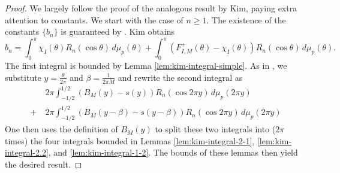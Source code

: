 \documentclass[11pt,letterpaper,reqno]{amsart}
\theoremstyle{definition}
\numberwithin{equation}{section}
\numberwithin{figure}{section}
\numberwithin{table}{section}
\begin{document}
\begin{proof}
  We largely follow the proof of the analogous result \cite[Theorem 2.6]{Kim24} by Kim, paying extra attention to constants. We start with the case of $n \geq 1$. The existence of the constants $\{b_n\}$ is guaranteed by \cite[Theorem 2.6]{Kim24}. Kim obtains
  \begin{equation}
      b_n = \int_0^\pi \chi_I(\theta) R_n(\cos \theta) \,d\mu_p(\theta) + \int_0^\pi \left( F_{I, M}^+(\theta) - \chi_I(\theta)  \right) R_n(\cos \theta) \,d\mu_p(\theta). \label{eqn:kim-decomp-of-bn}
  \end{equation}
The first integral is bounded by Lemma \ref{lem:kim-integral-simple}. As in \cite[Page 933]{DGMPT20}, we substitute $y = \frac{\theta}{2\pi} $ and $\beta = \frac{1}{2\pi M}$ and rewrite the second integral as
    \begin{align}
        &2\pi \int_{-1/2}^{1/2} \left( B_M(y) - s(y) \right) R_n(\cos 2\pi y ) \,d\mu_p(2\pi y)\\
        + ~ & 2\pi \int_{-1/2}^{1/2}
        \left( B_M(y - \beta ) - s(y - \beta) \right) R_n ( \cos 2 \pi y ) \,d\mu_p(2\pi y)
    \end{align}
    One then uses the definition of $B_M(y)$ to split these two integrals into ($2\pi$ times) the four integrals bounded in Lemmas \ref{lem:kim-integral-2-1}, \ref{lem:kim-integral-2.2}, and \ref{lem:kim-integral-1-2}. The bounds of these lemmas then yield the desired result.


\end{proof}
\end{document}
